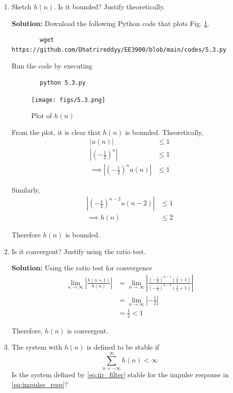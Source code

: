 \documentclass[journal,12pt,twocolumn]{IEEEtran}
\newcommand{\solution}{\noindent \textbf{Solution: }}
\providecommand{\brak}[1]{\ensuremath{\left(#1\right)}}
\providecommand{\abs}[1]{\left\vert#1\right\vert}
\numberwithin{equation}{section}
\renewcommand\thesection{\arabic{section}}
\begin{document}
\begin{enumerate}[label=\thesection.\arabic*]
	\item Sketch $h(n)$. Is it bounded? Justify theoretically.
	
	\solution Download the following Python code that plots Fig. \ref{fig-5.3}.
	\begin{lstlisting}
		wget https://github.com/Dhatrireddyy/EE3900/blob/main/codes/5.3.py
	\end{lstlisting}
	
	Run the code by executing
	\begin{lstlisting}
		python 5.3.py
	\end{lstlisting}

	\begin{figure}[!ht]
		\centering
		\texttt{[image: figs/5.3.png]}
		\caption{Plot of $h(n)$}
		\label{fig-5.3}	
	\end{figure} 
	
	From the plot, it is clear that $h(n)$ is bounded. Theoretically,
	\begin{align}
		\abs{u(n)} &\le 1 \\
		\abs{\brak{-\frac12}^n} &\le 1 \\
		\implies \abs{\brak{-\frac12}^n u(n)} &\le 1
	\end{align}
	
	Similarly,
	\begin{align}
		\abs{\brak{-\frac12}^{n-2} u(n-2)} &\le 1 \\
		\implies h(n) &\le 2
	\end{align}
	
	Therefore $h(n)$ is bounded.
	
	\item Is it convergent? Justify using the ratio test.
	
	\solution Using the ratio test for convergence
	\begin{align}
		\lim_{n \to \infty} \abs{\frac{h(n+1)}{h(n)}} &= \lim_{n \to \infty} \abs{\frac{\brak{-\frac12}^{n-1} \brak{\frac14 + 1}}{\brak{-\frac12}^{n-2} \brak{\frac14 + 1}}} \\
		&= \lim_{n \to \infty} \abs{-\frac12} \\
		&= \frac{1}{2} < 1
	\end{align}
	
	Therefore, $h(n)$ is convergent.
	
	\item The system with $h(n)$ is defined to be stable if
	\begin{equation}
		\sum_{n=-\infty}^{\infty}h(n) < \infty
	\end{equation}
	Is the system defined by \eqref{eq:iir_filter} stable for the impulse response in \eqref{eq:impulse_resp}?	
	

\end{enumerate}
\end{document}
